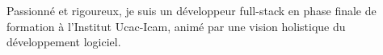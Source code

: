 

\begin{cvparagraph}

Passionné et rigoureux, je suis un développeur full-stack en phase finale de formation à l'Institut Ucac-Icam, animé par une vision holistique du développement logiciel.
\end{cvparagraph}
